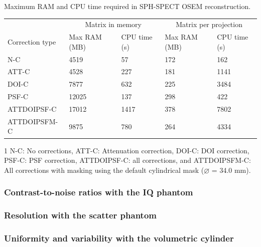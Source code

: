 \documentclass[utf8]{FrontiersinHarvard} %
\begin{document}
\begin{threeparttable}[h!]
\caption{Maximum RAM and CPU time required in SPH-SPECT OSEM reconstruction.\label{tab:computation_cost}}
\footnotesize
\begin{tabular}{l l l l l}
	\hline
	 & \multicolumn{2}{c}{Matrix in memory} & \multicolumn{2}{c}{Matrix per projection} \\ \cline{2-5}
	 Correction type\footnotemark[1] & Max RAM (MB) & CPU time (s) & Max RAM (MB) & CPU time (s) \\ \hline
	 
	 N-C & 4519 & 57 & 172 & 162 \\
	 
	 ATT-C & 4528 & 227 & 181 & 1141 \\
	 
	 DOI-C & 7877 & 632 & 225 & 3484 \\
	 
	 PSF-C & 12025 & 137 & 298 & 422 \\
	 
	 ATTDOIPSF-C & 17012 & 1417 & 378 & 7802 \\
	 
	 ATTDOIPSFM-C & 9875 & 780 & 264 & 4334 \\ \hline
	
\end{tabular}
\begin{tablenotes}
	\item[1]N-C: No corrections, ATT-C: Attenuation correction, DOI-C: DOI correction, PSF-C: PSF correction, ATTDOIPSF-C: all corrections, and ATTDOIPSFM-C: All corrections with masking using the default cylindrical mask ($\diameter$ = 34.0 mm).
\end{tablenotes}
\end{threeparttable}

\subsubsection{Contrast-to-noise ratios with the IQ phantom}



\subsubsection{Resolution with the scatter phantom}



\subsubsection{Uniformity and variability with the volumetric cylinder}
\end{document}

